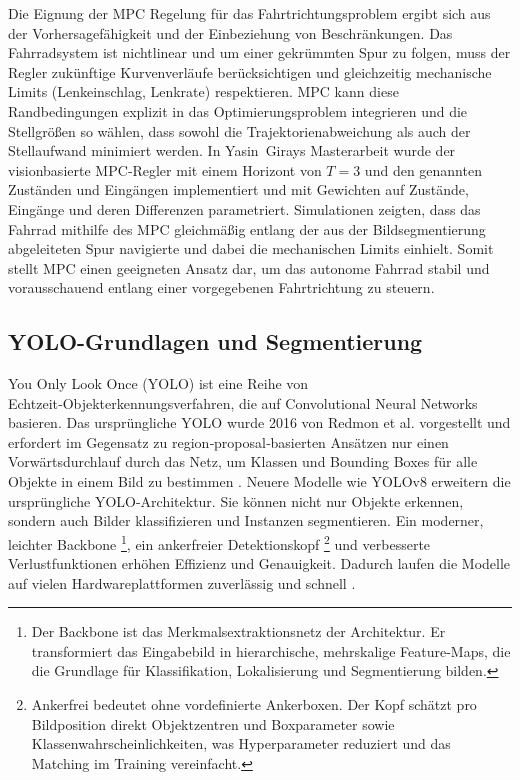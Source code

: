 Die Eignung der MPC Regelung für das Fahrtrichtungsproblem ergibt sich aus der Vorhersagefähigkeit und der Einbeziehung von Beschränkungen.  
Das Fahrradsystem ist nichtlinear und um einer gekrümmten Spur zu folgen, muss der Regler zukünftige Kurvenverläufe 
berücksichtigen und gleichzeitig mechanische Limits (Lenkeinschlag, Lenkrate) respektieren.  MPC kann diese Randbedingungen explizit 
in das Optimierungsproblem integrieren und die Stellgrößen so wählen, dass sowohl die Trajektorienabweichung als auch der Stellaufwand 
minimiert werden.  In Yasin Girays Masterarbeit wurde der visionbasierte MPC‑Regler mit einem Horizont von \(T=3\) und den genannten 
Zuständen und Eingängen implementiert und mit Gewichten auf Zustände, Eingänge und deren Differenzen parametriert.  
Simulationen zeigten, dass das Fahrrad mithilfe des MPC gleichmäßig entlang der aus der Bildsegmentierung abgeleiteten Spur navigierte und 
dabei die mechanischen Limits einhielt.  Somit stellt MPC einen geeigneten Ansatz dar, um das autonome Fahrrad stabil und vorausschauend 
entlang einer vorgegebenen Fahrtrichtung zu steuern.

\subsection{YOLO-Grundlagen und Segmentierung} \label{chap:yolo}

You Only Look Once (YOLO) ist eine Reihe von Echtzeit‑Objekterkennungsverfahren, die auf Convolutional Neural Networks basieren.  Das ursprüngliche YOLO wurde 
2016 von Redmon et al. vorgestellt und erfordert im Gegensatz zu region‑proposal‑basierten Ansätzen nur einen Vorwärtsdurchlauf durch das Netz, um Klassen und 
Bounding Boxes für alle Objekte in einem Bild zu bestimmen \citep{redmon2016you}.  Neuere Modelle wie YOLOv8 erweitern die ursprüngliche YOLO-Architektur. 
Sie können nicht nur Objekte erkennen, sondern auch Bilder klassifizieren und Instanzen segmentieren. Ein moderner, leichter Backbone
\footnote{Der Backbone ist das Merkmalsextraktionsnetz der Architektur. Er transformiert das Eingabebild in hierarchische, mehrskalige 
Feature-Maps, die die Grundlage für Klassifikation, Lokalisierung und Segmentierung bilden.}, ein ankerfreier 
Detektionskopf \footnote{Ankerfrei bedeutet ohne vordefinierte Ankerboxen. Der Kopf schätzt pro Bildposition direkt Objektzentren und 
Boxparameter sowie Klassenwahrscheinlichkeiten, was Hyperparameter reduziert und das Matching im Training vereinfacht.} und verbesserte 
Verlustfunktionen erhöhen Effizienz und Genauigkeit. Dadurch laufen die Modelle auf vielen Hardwareplattformen zuverlässig und schnell \citep{openmmlab_yolov8}.

